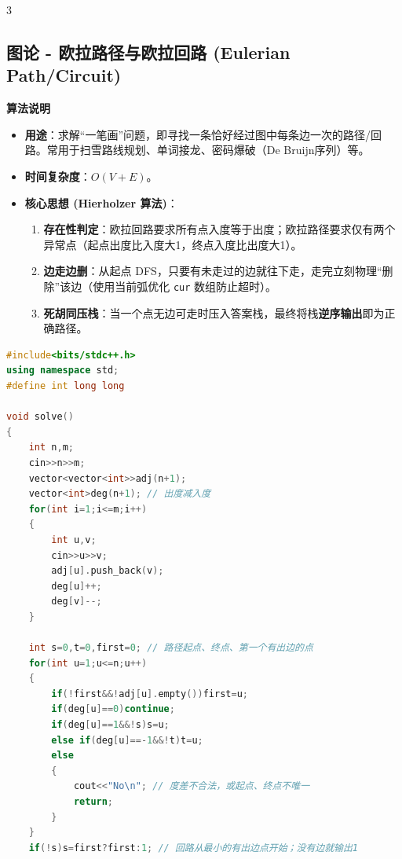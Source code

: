 \documentclass[10pt,landscape,a4paper]{article}
\begin{document}
\begin{multicols*}{3}
\subsection*{图论 - 欧拉路径与欧拉回路 (Eulerian Path/Circuit)}
\par\addvspace{0.7ex}\noindent\textbf{算法说明}\par\nobreak
\begin{itemize}
\item \textbf{用途}：求解“一笔画”问题，即寻找一条恰好经过图中每条边一次的路径/回路。常用于扫雪路线规划、单词接龙、密码爆破（De Bruijn序列）等。
\item \textbf{时间复杂度}：$O(V + E)$。
\item \textbf{核心思想 (Hierholzer 算法)}：
\begin{enumerate}[start=1]
\item \textbf{存在性判定}：欧拉回路要求所有点入度等于出度；欧拉路径要求仅有两个异常点（起点出度比入度大1，终点入度比出度大1）。
\item \textbf{边走边删}：从起点 DFS，只要有未走过的边就往下走，走完立刻物理“删除”该边（使用当前弧优化 \texttt{c\allowbreak{}u\allowbreak{}r} 数组防止超时）。
\item \textbf{死胡同压栈}：当一个点无边可走时压入答案栈，最终将栈\textbf{逆序输出}即为正确路径。
\end{enumerate}
\end{itemize}
\par{}\par
\begin{lstlisting}[language=C++]
#include<bits/stdc++.h>
using namespace std;
#define int long long

void solve()
{
    int n,m;
    cin>>n>>m;
    vector<vector<int>>adj(n+1);
    vector<int>deg(n+1); // 出度减入度
    for(int i=1;i<=m;i++)
    {
        int u,v;
        cin>>u>>v;
        adj[u].push_back(v);
        deg[u]++;
        deg[v]--;
    }

    int s=0,t=0,first=0; // 路径起点、终点、第一个有出边的点
    for(int u=1;u<=n;u++)
    {
        if(!first&&!adj[u].empty())first=u;
        if(deg[u]==0)continue;
        if(deg[u]==1&&!s)s=u;
        else if(deg[u]==-1&&!t)t=u;
        else
        {
            cout<<"No\n"; // 度差不合法，或起点、终点不唯一
            return;
        }
    }
    if(!s)s=first?first:1; // 回路从最小的有出边点开始；没有边就输出1


\end{lstlisting}
\end{multicols*}
\end{document}
